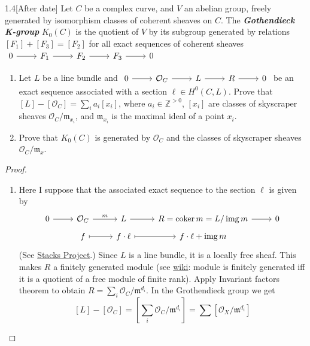 \begin{manualexercise}{1.4}[After date]
	Let $C$ be a complex curve, and $V$ an abelian group, freely generated by isomorphism classes of coherent sheaves on $C$. The \textit{\textbf{Gothendieck K-group}} $K_0(C)$ is the quotient of $V$ by its subgroup generated by relations $[F_1]+[F_3]=[F_2]$ for all exact sequences of coherent sheaves $\begin{tikzcd}
		0\arrow[r]&F_1\arrow[r]&F_2\arrow[r]&F_3\arrow[r]&0
	\end{tikzcd}$
	\begin{enumerate}[label=\alph*.]
		\item Let $L$ be a line bundle and $\begin{tikzcd}
			0\arrow[r]&\mathcal{O}_C\arrow[r]&L\arrow[r]&R\arrow[r]&0
		\end{tikzcd}$ be an exact sequence associated with a section $\ell \in H^{0}(C,L)$. Prove that $[L]-[\mathcal{O}_C]=\sum_{i}a_i[x_i]$, where $a_i\in\mathbb{Z}^{>0}$, $[x_i]$ are classes of skyscraper sheaves $\mathcal{O}_C/\mathfrak{m}_{x_i}$, and $\mathfrak{m}_{x_i}$ is the maximal ideal of a point $x_i$.
	
	\item Prove that $K_0(C)$ is generated by $\mathcal{O}_C$ and the classes of skyscraper sheaves $\mathcal{O}_C/\mathfrak{m}_{x}$.
	\end{enumerate}
\end{manualexercise}

\begin{proof}\leavevmode
	\begin{enumerate}[label=\alph*.]
		\item Here I suppose that the associated exact sequence to the section $\ell$ is given by
			\[\begin{tikzcd}[row sep=tiny]
				0\arrow[r]&\mathcal{O}_C\arrow[r,"m"]&L\arrow[r]&R=\operatorname{coker} m=L/\operatorname{img} m\arrow[r]&0\\
				& f\arrow[r,maps to]& f\cdot \ell\arrow[r,maps to]&f\cdot \ell+\operatorname{img} m
			\end{tikzcd}\]
			(See \href{https://stacks.math.columbia.edu/tag/01AL}{Stacks Project}.) Since  $L$ is a line bundle, it is a locally free sheaf. This makes $R$ a finitely generated module (see \href{https://en.wikipedia.org/wiki/Finitely_generated_module}{wiki}: module is finitely generated iff it is a quotient of a free module of finite rank). Apply Invariant factors theorem to obtain  $R=\sum_{i}\mathcal{O}_C/\mathfrak{m}^{d_i}$. In the Grothendieck group we get
			\[ [L]-[\mathcal{O}_C]=\left[\sum_{i}\mathcal{O}_C/\mathfrak{m}^{d_i}\right]= \sum [\mathcal{O}_X/\mathfrak{m}^{d_i}]\]
	\end{enumerate}
\end{proof}

